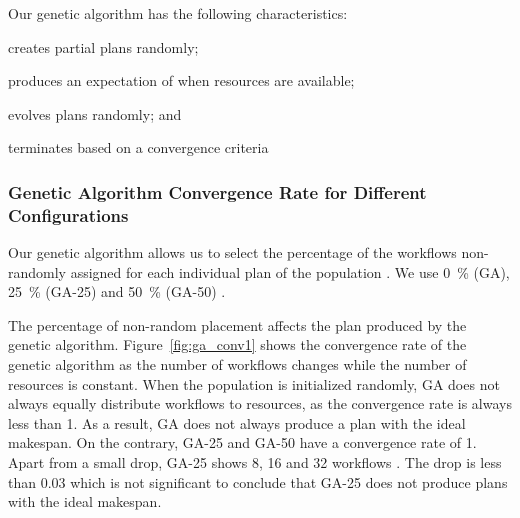 Our genetic algorithm has the following characteristics:
\begin{inparaenum}[(1)]
    \item creates partial plans randomly;
    \item produces an expectation of when resources are available;
    \item evolves plans randomly; and
    \item terminates based on a convergence criteria
\end{inparaenum}

\subsubsection*{Genetic Algorithm Convergence Rate for Different Configurations}

Our genetic algorithm allows us to select the percentage of the workflows
non-randomly assigned for each individual plan of the population . We
use 0~\% (GA), 25~\% (GA-25) and 50~\% (GA-50) .

The percentage of non-random placement affects the plan produced by the genetic
algorithm. Figure~\ref{fig:ga_conv1} shows the convergence rate of the genetic
algorithm as the number of workflows changes while the number of resources is
constant. When the population is initialized randomly, GA does not always
equally distribute workflows to resources, as the convergence rate is always
less than 1. As a result, GA does not always produce a plan with the ideal
makespan. On the contrary, GA-25 and GA-50 have a convergence rate of 1. Apart
from a small drop, GA-25 shows 8, 16 and 32 workflows . The drop is less than 0.03  which is not significant to conclude that
GA-25 does not produce plans with the ideal makespan.

